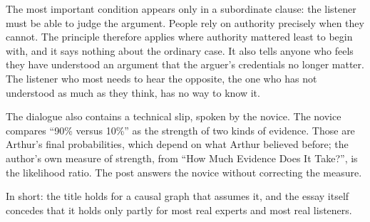 \begin{afterword}
The most important condition appears only in a subordinate clause: the listener must be able to judge the argument. People rely on authority precisely when they cannot. The principle therefore applies where authority mattered least to begin with, and it says nothing about the ordinary case. It also tells anyone who feels they have understood an argument that the arguer's credentials no longer matter. The listener who most needs to hear the opposite, the one who has not understood as much as they think, has no way to know it.

The dialogue also contains a technical slip, spoken by the novice. The novice compares ``90\% versus 10\%'' as the strength of two kinds of evidence. Those are Arthur's final probabilities, which depend on what Arthur believed before; the author's own measure of strength, from ``How Much Evidence Does It Take?'', is the likelihood ratio. The post answers the novice without correcting the measure.

In short: the title holds for a causal graph that assumes it, and the essay itself concedes that it holds only partly for most real experts and most real listeners.
\end{afterword}

